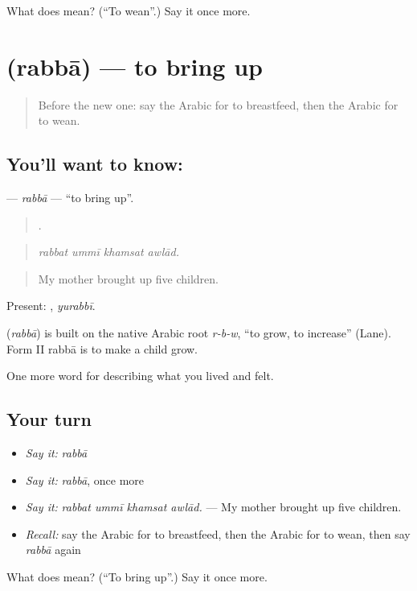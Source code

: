 \begin{tcolorbox}[breakable,colback=teal!4,colframe=teal!35!black,title={Before you move on}]
What does  mean? (\textquotedblleft{}To wean\textquotedblright{}.) Say it once more.
\end{tcolorbox}
\section[\texorpdfstring{\ar{ربى} (rabbā)}{ربى (rabbā)}]{ (rabbā) — to bring up}

\label{lesson:AR-C530-rabba}



\begin{quote}
Before the new one: say the Arabic for to breastfeed, then the Arabic for to wean.
\end{quote}

\subsection*{You'll want to know: }
\textbf{} — \emph{rabbā} — \textquotedblleft{}to bring up\textquotedblright{}.

\begin{quote}
   .
\end{quote}

\begin{quote}
\emph{rabbat ummī khamsat awlād.}
\end{quote}

\begin{quote}
My mother brought up five children.
\end{quote}

Present: , \emph{yurabbī}.

\begin{cousinweb}
\textbf{} (\emph{rabbā}) is built on the native Arabic root \emph{r-b-w}, \textquotedblleft{}to grow, to increase\textquotedblright{} (Lane). Form II rabbā is to make a child grow.
\end{cousinweb}

\begin{grammarlens}[title={What you've built}]
One more word for describing what you lived and felt.
\end{grammarlens}

\subsection*{Your turn}
\begin{itemize}
\raggedright
  \item \emph{Say it:} \emph{rabbā}
  \item \emph{Say it:} \emph{rabbā}, once more
  \item \emph{Say it:} \emph{rabbat ummī khamsat awlād.} — My mother brought up five children.
  \item \emph{Recall:} say the Arabic for to breastfeed, then the Arabic for to wean, then say \emph{rabbā} again
\end{itemize}

\begin{tcolorbox}[breakable,colback=teal!4,colframe=teal!35!black,title={Before you move on}]
What does  mean? (\textquotedblleft{}To bring up\textquotedblright{}.) Say it once more.
\end{tcolorbox}
